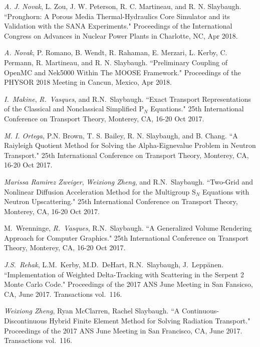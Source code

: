 \begin{bibsection}
\item \textit{A. J. Novak}, L. Zou, J. W. Peterson, R. C. Martineau, and R. N. Slaybaugh.
``Pronghorn: A Porous Media Thermal-Hydraulics Core Simulator and its Validation with the SANA Experiments." Proceedings of the International Congress on Advances in Nuclear Power Plants in Charlotte, NC, Apr 2018. 

\item \textit{A. Novak}, P. Romano, B. Wendt, R. Rahaman, E. Merzari, L. Kerby, C. Permann, R. Martineau, and R. N. Slaybaugh. ``Preliminary Coupling of OpenMC and Nek5000 Within The MOOSE Framework." Proceedings of the PHYSOR 2018 Meeting in Cancun, Mexico, Apr 2018. 

\item  \textit{I.\ Makine}, \textit{R.\ Vasques}, and R.N.\ Slaybaugh. ``Exact Transport Representations of the Classical and Nonclassical Simplified P$_N$ Equations." 25th International Conference on Transport Theory, Monterey, CA, 16-20 Oct 2017.

\item \textit{M. I. Ortega}, P.N. Brown, T. S. Bailey, R. N. Slaybaugh, and B. Chang. ``A Raiyleigh Quotient Method for Solving the Alpha-Eignevalue Problem in Neutron Transport." 25th International Conference on Transport Theory, Monterey, CA, 16-20 Oct 2017.

\item  \textit{Marissa Ramirez Zweiger}, \textit{Weixiong Zheng}, and R.N.\ Slaybaugh. ``Two-Grid and Nonlinear Diffusion Acceleration Method for the Multigroup S$_N$ Equations with Neutron Upscattering." 25th International Conference on Transport Theory, Monterey, CA, 16-20 Oct 2017.

\item M.\ Wrenninge, \textit{R.\ Vasques}, R.N.\ Slaybaugh. ``A Generalized Volume Rendering Approach for Computer Graphics." 25th International Conference on Transport Theory, Monterey, CA, 16-20 Oct 2017.

\item \textit{J.S.\ Rehak}, L.M.\ Kerby, M.D.\ DeHart, R.N.\ Slaybaugh, J.\ Lepp\"{a}nen. ``Implementation of Weighted Delta-Tracking with Scattering in the Serpent 2 Monte Carlo Code." Proceedings of the 2017 ANS June Meeting in San Fansicso, CA, June 2017. Transactions vol.\ 116.

\item\textit{ Weixiong Zheng}, Ryan McClarren, Rachel Slaybaugh. ``A Continuous-Discontinuous Hybrid Finite Element Method for Solving Radiation Transport." Proceedings of the 2017 ANS June Meeting in San Francisco, CA, June 2017. Transactions vol.\ 116.


\end{bibsection}
